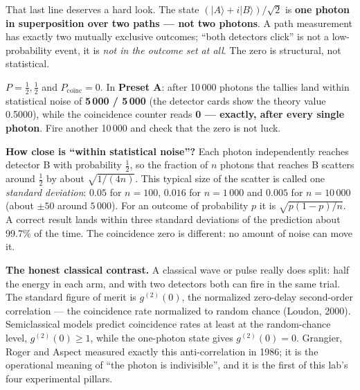 \documentclass[a4paper,11pt]{article}
\providecommand{\ket}[1]{|#1\rangle}
\begin{document}
That last line deserves a hard look. The state $(\ket{A} + i\ket{B})/\sqrt 2$ is
\textbf{one photon in superposition over two paths --- not two photons}. A path
measurement has exactly two mutually exclusive outcomes; ``both detectors click'' is
not a low-probability event, it is \emph{not in the outcome set at all}. The zero is
structural, not statistical.

\begin{numberbox}
$P = \tfrac12, \tfrac12$ and $P_{\text{coinc}} = 0$. In \textbf{Preset A}: after
10\,000 photons the tallies land within statistical noise of
\textbf{5\,000 / 5\,000} (the detector cards show the theory value 0.5000), while the
coincidence counter reads \textbf{0 --- exactly, after every single photon}. Fire
another 10\,000 and check that the zero is not luck.

\smallskip
\textbf{How close is ``within statistical noise''?} Each photon independently reaches
detector B with probability $\tfrac12$, so the fraction of $n$ photons that reaches B
scatters around $\tfrac12$ by about $\sqrt{1/(4n)}$. This typical size of the scatter is
called one \emph{standard deviation}: $0.05$ for $n = 100$, $0.016$ for $n = 1\,000$ and
$0.005$ for $n = 10\,000$ (about $\pm 50$ around $5\,000$). For an outcome of probability
$p$ it is $\sqrt{p(1-p)/n}$. A correct result lands within three standard deviations of
the prediction about 99.7\% of the time. The coincidence zero is different: no amount of noise
can move it.
\end{numberbox}

\begin{warningbox}
\textbf{The honest classical contrast.} A classical wave or pulse really does split:
half the energy in each arm, and with two detectors both can fire in the same trial.
The standard figure of merit is $g^{(2)}(0)$, the normalized zero-delay second-order
correlation --- the coincidence rate normalized to random chance (Loudon, 2000).
Semiclassical models predict coincidence rates at least at the random-chance level,
$g^{(2)}(0) \geq 1$, while the one-photon state gives $g^{(2)}(0) = 0$. Grangier,
Roger and Aspect measured exactly this anti-correlation in 1986; it is the
operational meaning of ``the photon is indivisible'', and it is the first of this
lab's four experimental pillars.
\end{warningbox}
\end{document}
